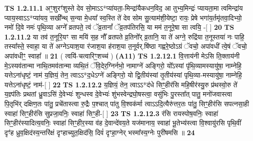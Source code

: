 \documentclass[17pt]{extarticle}
\begin{document}
                                        \textbf{ TS 1.2.11.1} \newline
                  अꣳ॒॒शुरꣳ॑शुस्ते देव सो॒माऽऽ*प्या॑यता॒-मिन्द्रा॑यैकधन॒विद॒ आ तुभ्य॒मिन्द्रः॑ प्यायता॒मा त्वमिन्द्रा॑य प्याय॒स्वाऽऽ*प्या॑यय॒ सखी᳚न्थ् स॒न्या मे॒धया᳚ स्व॒स्ति ते॑ देव सोम सु॒त्याम॑शी॒येष्टा॒ रायः॒ प्रेषे भगा॑य॒र्तमृ॑तवा॒दिभ्यो॒ नमो॑ दि॒वे नमः॑ पृथि॒व्या अग्ने᳚ व्रतपते॒ त्वं ॅव्र॒तानां᳚ ॅव्र॒तप॑तिरसि॒ या मम॑ त॒नूरे॒षा सा त्वयि॒ -[ ] \textbf{  20} \newline
                  \newline
                                \textbf{ TS 1.2.11.2} \newline
                  या तव॑ त॒नूरि॒यꣳ सा मयि॑ स॒ह नौ᳚ व्रतपते व्र॒तिनो᳚र् व्र॒तानि॒ या ते॑ अग्ने॒ रुद्रि॑या त॒नूस्तया॑ नः पाहि॒ तस्या᳚स्ते॒ स्वाहा॒ या ते॑ अग्नेऽयाश॒या र॑जाश॒या ह॑राश॒या त॒नूर्वर्.षि॑ष्ठा गह्वरे॒ष्ठोऽग्रं ॅवचो॒ अपा॑वधीं त्वे॒षं ॅवचो॒ अपा॑वधीꣳ॒॒ स्वाहा᳚ ॥ \textbf{  21 } \newline
                  \newline
                      ( त्वयि॑-चत्वारिꣳ॒॒शच्च॑ )  \textbf{(A11)} \newline \newline
                                        \textbf{ TS 1.2.12.1} \newline
                  वि॒त्ताय॑नी मेऽसि ति॒क्ताय॑नी मे॒ऽस्यव॑तान्मा नाथि॒तमव॑तान्मा व्यथि॒तं ॅवि॒देर॒ग्निर्नभो॒ नामाग्ने॑ अङ्गिरो॒ यो᳚ऽस्यां पृ॑थि॒व्यामस्यायु॑षा॒ नाम्नेहि॒ यत्तेऽना॑धृष्टं॒ नाम॑ य॒ज्ञियं॒ तेन॒ त्वाऽऽ*द॒धेऽग्ने॑ अङ्गिरो॒ यो द्वि॒तीय॑स्यां तृ॒तीय॑स्यां पृथि॒व्या-मस्यायु॑षा॒ नाम्नेहि॒ यत्तेऽना॑धृष्टं॒ नाम॑-[ ] \textbf{  22} \newline
                  \newline
                                \textbf{ TS 1.2.12.2} \newline
                  य॒ज्ञियं॒ तेन॒ त्वाऽऽ*द॑धे सिꣳ॒॒हीर॑सि महि॒षीर॑स्यु॒रु प्र॑थस्वो॒रु ते॑ य॒ज्ञ्प॑तिः प्रथतां ध्रु॒वाऽसि॑ दे॒वेभ्यः॑ शुन्धस्व दे॒वेभ्यः॑ शुंभस्वेन्द्रघो॒षस्त्वा॒ वसु॑भिः पु॒रस्ता᳚त् पातु॒ मनो॑जवास्त्वा पि॒तृभि॑र् दक्षिण॒तः पा॑तु॒ प्रचे॑तास्त्वा रु॒द्रैः प॒श्चात् पा॑तु वि॒श्वक॑र्मा त्वाऽऽदि॒त्यैरु॑त्तर॒तः पा॑तु॒ सिꣳ॒॒हीर॑सि सपत्नसा॒ही स्वाहा॑ सिꣳ॒॒हीर॑सि सुप्रजा॒वनिः॒ स्वाहा॑ सिꣳ॒॒ही-[ ] \textbf{  23} \newline
                  \newline
                                \textbf{ TS 1.2.12.3} \newline
                  र॑सि रायस्पोष॒वनिः॒ स्वाहा॑ सिꣳ॒॒हीर॑स्यादित्य॒वनिः॒ स्वाहा॑ सिꣳ॒॒हीर॒स्या व॑ह दे॒वान्दे॑वय॒ते यज॑मानाय॒ स्वाहा॑ भू॒तेभ्य॑स्त्वा वि॒श्वायु॑रसि पृथि॒वीं दृꣳ॑ह ध्रुव॒क्षिद॑स्य॒न्तरि॑क्षं दृꣳहाच्युत॒क्षिद॑सि॒ दिवं॑ दृꣳहा॒ग्नेर् भस्मा᳚स्य॒ग्नेः पुरी॑षमसि ॥ \textbf{  24} \newline
\end{document}
